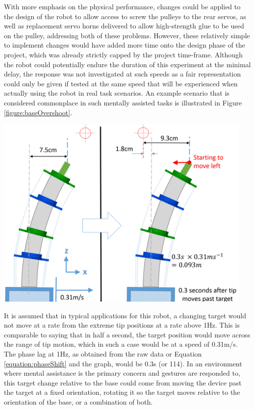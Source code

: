 \documentclass[11pt]{article}
\begin{document}
With more emphasis on the physical performance, changes could be applied to the design of the robot to allow access to screw the pulleys to the rear servos, as well as replacement servo horns delivered to allow high-strength glue to be used on the pulley, addressing both of these problems. However, these relatively simple to implement changes would have added more time onto the design phase of the project, which was already strictly capped by the project time-frame. Although the robot could potentially endure the duration of this experiment at the minimal delay, the response was not investigated at such speeds as a fair representation could only be given if tested at the same speed that will be experienced when actually using the robot in real task scenarios. An example scenario that is considered commonplace in such mentally assisted tasks is illustrated in Figure \ref{figure:baseOvershoot}.

\begin{center}
\includegraphics[width=0.95\textwidth]{images/baseOvershoot.png}
\label{figure:baseOvershoot}
\end{center}


It is assumed that in typical applications for this robot, a changing target would not move at a rate from the extreme tip positions at a rate above 1Hz. This is comparable to saying that in half a second, the target position would move across the range of tip motion, which in such a case would be at a speed of 0.31m/s. The phase lag at 1Hz, as obtained from the raw data or Equation \ref{equation:phaseShift} and the graph, would be 0.3s (or 114\degree). In an environment where mental assistance is the primary concern and gestures are responded to, this target change relative to the base could come from moving the device past the target at a fixed orientation, rotating it so the target moves relative to the orientation of the base, or a combination of both.
\end{document}
